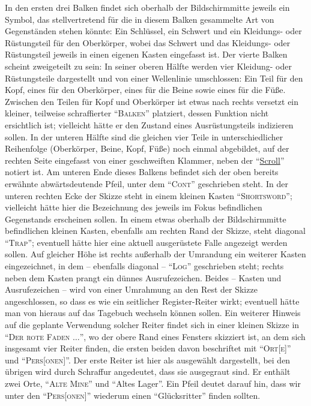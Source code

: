 \documentclass[a5paper,pagesize,numbers=noenddot]{scrbook}
\begin{document}
In den ersten drei Balken findet sich oberhalb der Bildschirmmitte jeweils ein Symbol, das stellvertretend für die in diesem Balken gesammelte Art von Gegenständen stehen könnte:
Ein Schlüssel, ein Schwert und ein Kleidungs- oder Rüstungsteil für den Oberkörper, wobei das Schwert und das Kleidungs- oder Rüstungsteil jeweils in einen eigenen Kasten eingefasst ist.
Der vierte Balken scheint zweigeteilt zu sein:
In seiner oberen Hälfte werden vier Kleidung- oder Rüstungsteile dargestellt und von einer Wellenlinie umschlossen:
Ein Teil für den Kopf, eines für den Oberkörper, eines für die Beine sowie eines für die Füße.
Zwischen den Teilen für Kopf und Oberkörper ist etwas nach rechts versetzt ein kleiner, teilweise schraffierter \enquote{\textsc{Balken}} platziert, dessen Funktion nicht ersichtlich ist; vielleicht hätte er den Zustand eines Ausrüstungsteils indizieren sollen. %
In der unteren Hälfte sind die gleichen vier Teile in unterschiedlicher Reihenfolge (Oberkörper, Beine, Kopf, Füße) noch einmal abgebildet, auf der rechten Seite eingefasst von einer geschweiften Klammer, neben der \enquote{\uline{Scroll}} notiert ist.
Am unteren Ende dieses Balkens befindet sich der oben bereits erwähnte abwärtsdeutende Pfeil, unter dem \enquote{\textsc{Cont}} geschrieben steht.
In der unteren rechten Ecke der Skizze steht in einem kleinen Kasten \enquote{\textsc{Shortsword}}; vielleicht hätte hier die Bezeichnung des jeweils im Fokus befindlichen Gegenstands erscheinen sollen. %
In einem etwas oberhalb der Bildschirmmitte befindlichen kleinen Kasten, ebenfalls am rechten Rand der Skizze, steht diagonal \enquote{\textsc{Trap}}; eventuell hätte hier eine aktuell ausgerüstete Falle angezeigt werden sollen. %
Auf gleicher Höhe ist rechts außerhalb der Umrandung ein weiterer Kasten eingezeichnet, in dem -- ebenfalls diagonal -- \enquote{\textsc{Log}} geschrieben steht; rechts neben dem Kasten prangt ein dünnes Ausrufezeichen.
Beides -- Kasten und Ausrufezeichen -- wird von einer Umrahmung an den Rest der Skizze angeschlossen, so dass es wie ein seitlicher Register-Reiter wirkt; eventuell hätte man von hieraus auf das Tagebuch wechseln können sollen.
Ein weiterer Hinweis auf die geplante Verwendung solcher Reiter findet sich in einer kleinen Skizze in \enquote{\textsc{Der rote Faden $\ldots$}}, wo der obere Rand eines Fensters skizziert ist, an dem sich insgesamt vier Reiter finden, die ersten beiden davon beschriftet mit \enquote{\textsc{Ort[e]}} und \enquote{\textsc{Pers[onen]}}.
Der erste Reiter ist hier als ausgewählt dargestellt, bei den übrigen wird durch Schraffur angedeutet, dass sie ausgegraut sind.
Er enthält zwei Orte, \enquote{\textsc{Alte Mine}} und \enquote{Altes Lager}.
Ein Pfeil deutet darauf hin, dass wir unter den \enquote{\textsc{Pers[onen]}} wiederum einen \enquote{Glücksritter} finden sollten.
\end{document}
